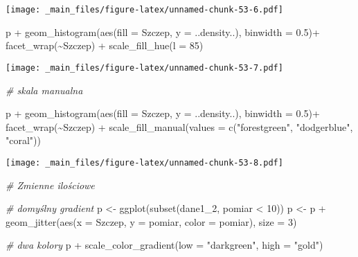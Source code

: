 \documentclass[
]{book}
\newenvironment{Shaded}{\begin{snugshade}}{\end{snugshade}}
\newcommand{\AttributeTok}[1]{\textcolor[rgb]{0.77,0.63,0.00}{#1}}
\newcommand{\CommentTok}[1]{\textcolor[rgb]{0.56,0.35,0.01}{\textit{#1}}}
\newcommand{\DecValTok}[1]{\textcolor[rgb]{0.00,0.00,0.81}{#1}}
\newcommand{\FloatTok}[1]{\textcolor[rgb]{0.00,0.00,0.81}{#1}}
\newcommand{\FunctionTok}[1]{\textcolor[rgb]{0.00,0.00,0.00}{#1}}
\newcommand{\NormalTok}[1]{#1}
\newcommand{\OtherTok}[1]{\textcolor[rgb]{0.56,0.35,0.01}{#1}}
\newcommand{\SpecialCharTok}[1]{\textcolor[rgb]{0.00,0.00,0.00}{#1}}
\newcommand{\StringTok}[1]{\textcolor[rgb]{0.31,0.60,0.02}{#1}}
\begin{document}
\texttt{[image: \_main\_files/figure-latex/unnamed-chunk-53-6.pdf]}

\begin{Shaded}
\begin{Highlighting}[]
\NormalTok{p }\SpecialCharTok{+} \FunctionTok{geom\_histogram}\NormalTok{(}\FunctionTok{aes}\NormalTok{(}\AttributeTok{fill =}\NormalTok{ Szczep, }\AttributeTok{y =}\NormalTok{ ..density..), }\AttributeTok{binwidth =} \FloatTok{0.5}\NormalTok{)}\SpecialCharTok{+}
  \FunctionTok{facet\_wrap}\NormalTok{(}\SpecialCharTok{\textasciitilde{}}\NormalTok{Szczep) }\SpecialCharTok{+} \FunctionTok{scale\_fill\_hue}\NormalTok{(}\AttributeTok{l =} \DecValTok{85}\NormalTok{)}
\end{Highlighting}
\end{Shaded}

\texttt{[image: \_main\_files/figure-latex/unnamed-chunk-53-7.pdf]}

\begin{Shaded}
\begin{Highlighting}[]
\CommentTok{\# skala manualna}

\NormalTok{p }\SpecialCharTok{+} \FunctionTok{geom\_histogram}\NormalTok{(}\FunctionTok{aes}\NormalTok{(}\AttributeTok{fill =}\NormalTok{ Szczep, }\AttributeTok{y =}\NormalTok{ ..density..), }\AttributeTok{binwidth =} \FloatTok{0.5}\NormalTok{)}\SpecialCharTok{+}
  \FunctionTok{facet\_wrap}\NormalTok{(}\SpecialCharTok{\textasciitilde{}}\NormalTok{Szczep) }\SpecialCharTok{+} \FunctionTok{scale\_fill\_manual}\NormalTok{(}\AttributeTok{values =} \FunctionTok{c}\NormalTok{(}\StringTok{"forestgreen"}\NormalTok{, }\StringTok{"dodgerblue"}\NormalTok{, }\StringTok{"coral"}\NormalTok{))}
\end{Highlighting}
\end{Shaded}

\texttt{[image: \_main\_files/figure-latex/unnamed-chunk-53-8.pdf]}

\begin{Shaded}
\begin{Highlighting}[]
\CommentTok{\# Zmienne ilościowe}

\CommentTok{\# domyślny gradient}
\NormalTok{p }\OtherTok{\textless{}{-}} \FunctionTok{ggplot}\NormalTok{(}\FunctionTok{subset}\NormalTok{(dane1\_2, pomiar }\SpecialCharTok{\textless{}} \DecValTok{10}\NormalTok{))}
\NormalTok{p  }\OtherTok{\textless{}{-}}\NormalTok{ p }\SpecialCharTok{+} \FunctionTok{geom\_jitter}\NormalTok{(}\FunctionTok{aes}\NormalTok{(}\AttributeTok{x =}\NormalTok{ Szczep, }\AttributeTok{y =}\NormalTok{ pomiar, }\AttributeTok{color =}\NormalTok{ pomiar), }\AttributeTok{size =} \DecValTok{3}\NormalTok{)}

\CommentTok{\# dwa kolory}
\NormalTok{p }\SpecialCharTok{+} \FunctionTok{scale\_color\_gradient}\NormalTok{(}\AttributeTok{low =} \StringTok{"darkgreen"}\NormalTok{, }\AttributeTok{high =} \StringTok{"gold"}\NormalTok{)}
\end{Highlighting}
\end{Shaded}
\end{document}

